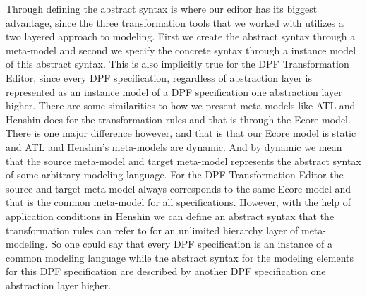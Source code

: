Through defining the abstract syntax is where our editor has its biggest
advantage, since the three transformation tools that we worked with utilizes a
two layered approach to modeling. First we create the abstract syntax through a
meta-model and second we specify the concrete syntax through a instance model
of this abstract syntax. This is also implicitly true for the DPF Transformation
Editor, since every DPF specification, regardless of abstraction layer is
represented as an instance model of a DPF specification one abstraction layer
higher. There are some similarities to how we present meta-models like ATL and
Henshin does for the transformation rules and that is through the Ecore model.
There is one major difference however, and that is that our Ecore model is
static and ATL and Henshin's meta-models are dynamic. And by dynamic we mean
that the source meta-model and target meta-model represents the abstract syntax
of some arbitrary modeling language. For the DPF Transformation Editor the
source and target meta-model always corresponds to the same Ecore model and that
is the common meta-model for all specifications. However, with the help of
application conditions in Henshin we can define an abstract syntax that the
transformation rules can refer to for an unlimited hierarchy layer of
meta-modeling. So one could say that every DPF specification is an instance of a
common modeling language while the abstract syntax for the modeling elements
for this DPF specification are described by another DPF specification one
abstraction layer higher.

